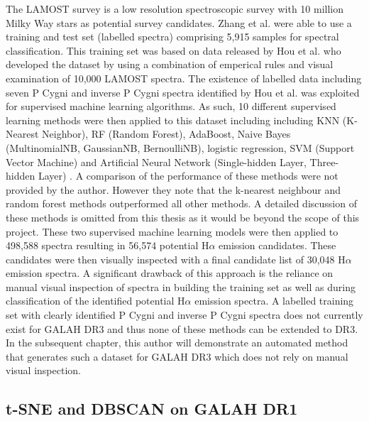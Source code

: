 The LAMOST survey is a low resolution spectroscopic survey with 10 million Milky Way stars as potential survey candidates. Zhang et al. were able to use a training and test set (labelled spectra) comprising 5,915 samples for spectral classification. This training set was based on data released by Hou et al. \cite{hou2016catalog} who developed the dataset by using a combination of emperical rules and visual examination of 10,000 LAMOST spectra. The existence of labelled data including seven P Cygni and inverse P Cygni spectra identified by Hou et al. was exploited for supervised machine learning algorithms. As such, 10 different supervised learning methods were then applied to this dataset including including KNN (K-Nearest Neighbor), RF (Random Forest), AdaBoost, Naive Bayes (MultinomialNB, GaussianNB, BernoulliNB), logistic regression, SVM (Support Vector Machine) and Artificial Neural Network (Single-hidden Layer, Three-hidden Layer) \cite{zhang2021catalog}. A comparison of the performance of these methods were not provided by the author. However they note that the k-nearest neighbour and random forest methods outperformed all other methods. A detailed discussion of these methods is omitted from this thesis as it would be beyond the scope of this project. These two supervised machine learning models were then applied to 498,588 spectra resulting in 56,574 potential H$\alpha$ emission candidates. These candidates were then visually inspected with a final candidate list of 30,048 H$\alpha$ emission spectra. A significant drawback of this approach is the reliance on manual visual inspection of spectra in building the training set as well as during classification of the identified potential H$\alpha$ emission spectra. A labelled training set with clearly identified P Cygni and inverse P Cygni spectra does not currently exist for GALAH DR3 and thus none of these methods can be extended to DR3. In the subsequent chapter, this author will demonstrate an automated method that generates such a dataset for GALAH DR3 which does not rely on manual visual inspection.

\subsection{t-SNE and DBSCAN on GALAH DR1}

